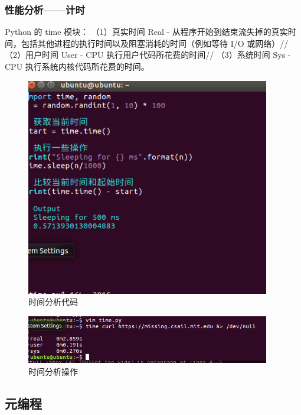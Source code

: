 \documentclass[UTF8]{ctexart}
\begin{document}
\subsubsection{性能分析——计时}
 Python 的 time 模块：
 （1）真实时间 Real - 从程序开始到结束流失掉的真实时间，包括其他进程的执行时间以及阻塞消耗的时间（例如等待 I/O 或网络）//
（2）用户时间 User - CPU 执行用户代码所花费的时间//
（3）系统时间 Sys - CPU 执行系统内核代码所花费的时间。
\begin{figure}[H]
    \centering
    \includegraphics[width=0.95\textwidth]{picture/时间分析代码.png}
    \caption{时间分析代码}
\end{figure}

\begin{figure}[H]
    \centering
    \includegraphics[width=0.95\textwidth]{picture/时间分析操作运行.png}
    \caption{时间分析操作}
\end{figure}



\subsection{元编程}
\end{document}
